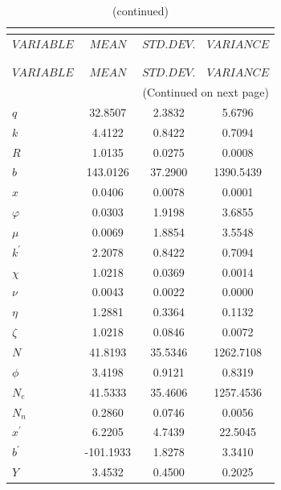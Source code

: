  
\begin{center}
\begin{longtable}{lccc} 
\caption{THEORETICAL MOMENTS}\\
 \label{Table:th_moments}\\
\toprule 
$VARIABLE  $	 & 	 $         MEAN$	 & 	 $    STD. DEV.$	 & 	 $     VARIANCE$\\
\midrule \endfirsthead 
\caption{(continued)}\\
 \toprule \\ 
$VARIABLE  $	 & 	 $         MEAN$	 & 	 $    STD. DEV.$	 & 	 $     VARIANCE$\\
\midrule \endhead 
\midrule \multicolumn{4}{r}{(Continued on next page)} \\ \bottomrule \endfoot 
\bottomrule \endlastfoot 
$q         $	 & 	      32.8507	 & 	       2.3832	 & 	       5.6796 \\ 
$k         $	 & 	       4.4122	 & 	       0.8422	 & 	       0.7094 \\ 
$R         $	 & 	       1.0135	 & 	       0.0275	 & 	       0.0008 \\ 
$b         $	 & 	     143.0126	 & 	      37.2900	 & 	    1390.5439 \\ 
$x         $	 & 	       0.0406	 & 	       0.0078	 & 	       0.0001 \\ 
$\varphi   $	 & 	       0.0303	 & 	       1.9198	 & 	       3.6855 \\ 
$\mu       $	 & 	       0.0069	 & 	       1.8854	 & 	       3.5548 \\ 
$k^\prime  $	 & 	       2.2078	 & 	       0.8422	 & 	       0.7094 \\ 
$\chi      $	 & 	       1.0218	 & 	       0.0369	 & 	       0.0014 \\ 
$\nu       $	 & 	       0.0043	 & 	       0.0022	 & 	       0.0000 \\ 
$\eta      $	 & 	       1.2881	 & 	       0.3364	 & 	       0.1132 \\ 
$\zeta     $	 & 	       1.0218	 & 	       0.0846	 & 	       0.0072 \\ 
$N         $	 & 	      41.8193	 & 	      35.5346	 & 	    1262.7108 \\ 
$\phi      $	 & 	       3.4198	 & 	       0.9121	 & 	       0.8319 \\ 
$N_e       $	 & 	      41.5333	 & 	      35.4606	 & 	    1257.4536 \\ 
$N_n       $	 & 	       0.2860	 & 	       0.0746	 & 	       0.0056 \\ 
$x^\prime  $	 & 	       6.2205	 & 	       4.7439	 & 	      22.5045 \\ 
$b^\prime  $	 & 	    -101.1933	 & 	       1.8278	 & 	       3.3410 \\ 
$Y         $	 & 	       3.4532	 & 	       0.4500	 & 	       0.2025 \\ 
\end{longtable}
 \end{center}
